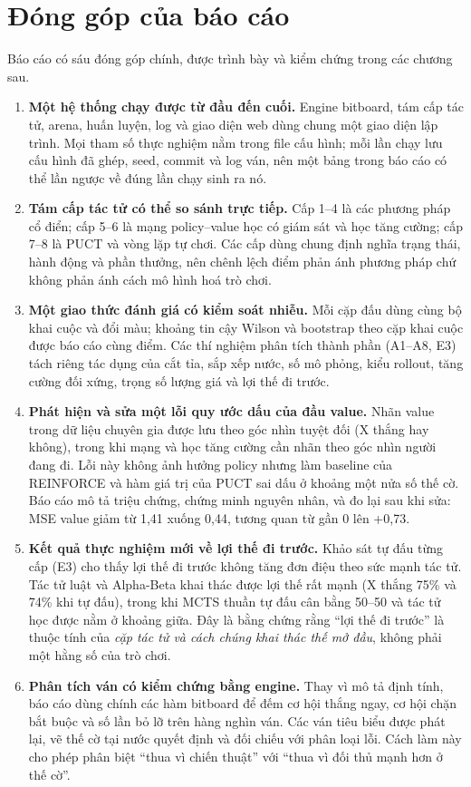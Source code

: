 \section{Đóng góp của báo cáo}
\label{sec:gt-dong-gop}
Báo cáo có sáu đóng góp chính, được trình bày và kiểm chứng trong các chương sau.

\begin{enumerate}
  \item \textbf{Một hệ thống chạy được từ đầu đến cuối.} Engine bitboard, tám cấp tác tử, arena,
        huấn luyện, log và giao diện web dùng chung một giao diện lập trình. Mọi tham số thực
        nghiệm nằm trong file cấu hình; mỗi lần chạy lưu cấu hình đã ghép, seed, commit và log
        ván, nên một bảng trong báo cáo có thể lần ngược về đúng lần chạy sinh ra nó.
  \item \textbf{Tám cấp tác tử có thể so sánh trực tiếp.} Cấp 1--4 là các phương pháp cổ điển;
        cấp 5--6 là mạng policy--value học có giám sát và học tăng cường; cấp 7--8 là PUCT và
        vòng lặp tự chơi. Các cấp dùng chung định nghĩa trạng thái, hành động và phần thưởng,
        nên chênh lệch điểm phản ánh phương pháp chứ không phản ánh cách mô hình hoá trò chơi.
  \item \textbf{Một giao thức đánh giá có kiểm soát nhiễu.} Mỗi cặp đấu dùng cùng bộ khai cuộc
        và đổi màu; khoảng tin cậy Wilson và bootstrap theo cặp khai cuộc được báo cáo cùng điểm.
        Các thí nghiệm phân tích thành phần (A1--A8, E3) tách riêng tác dụng của cắt tỉa, sắp
        xếp nước, số mô phỏng, kiểu rollout, tăng cường đối xứng, trọng số lượng giá và lợi thế
        đi trước.
  \item \textbf{Phát hiện và sửa một lỗi quy ước dấu của đầu value.} Nhãn value trong dữ liệu
        chuyên gia được lưu theo góc nhìn tuyệt đối (X thắng hay không), trong khi mạng và học
        tăng cường cần nhãn theo góc nhìn người đang đi. Lỗi này không ảnh hưởng policy nhưng
        làm baseline của REINFORCE và hàm giá trị của PUCT sai dấu ở khoảng một nửa số thế cờ.
        Báo cáo mô tả triệu chứng, chứng minh nguyên nhân, và đo lại sau khi sửa: MSE value giảm
        từ 1,41 xuống 0,44, tương quan từ gần 0 lên +0,73.
  \item \textbf{Kết quả thực nghiệm mới về lợi thế đi trước.} Khảo sát tự đấu từng cấp (E3) cho
        thấy lợi thế đi trước không tăng đơn điệu theo sức mạnh tác tử. Tác tử luật và Alpha-Beta
        khai thác được lợi thế rất mạnh (X thắng 75\% và 74\% khi tự đấu), trong khi MCTS thuần
        tự đấu cân bằng 50--50 và tác tử học được nằm ở khoảng giữa. Đây là bằng chứng rằng
        ``lợi thế đi trước'' là thuộc tính của \emph{cặp tác tử và cách chúng khai thác thế mở
        đầu}, không phải một hằng số của trò chơi.
  \item \textbf{Phân tích ván có kiểm chứng bằng engine.} Thay vì mô tả định tính, báo cáo dùng
        chính các hàm bitboard để đếm cơ hội thắng ngay, cơ hội chặn bắt buộc và số lần bỏ lỡ
        trên hàng nghìn ván. Các ván tiêu biểu được phát lại, vẽ thế cờ tại nước quyết định và
        đối chiếu với phân loại lỗi. Cách làm này cho phép phân biệt ``thua vì chiến thuật'' với
        ``thua vì đối thủ mạnh hơn ở thế cờ''.
\end{enumerate}

